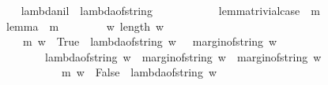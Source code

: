 \begin{isabellebody}
\ \ \isanewline
{}\isamarkupfalse%
\ lambda{\isacharunderscore}nil\ {\isacharcolon}\ {\isachardoublequoteopen}lambda{\isacharunderscore}of{\isacharunderscore}string\ {\isacharbrackleft}{\isacharbrackright}\ {\isacharequal}\ {}{\isachardoublequoteclose}\isanewline
%
\isadelimproof
\ \ %
\endisadelimproof
%
\isatagproof
{}\isamarkupfalse%
%
\endisatagproof
{\isafoldproof}%
%
\isadelimproof
\isanewline
%
\endisadelimproof
\ \ \ \ \isanewline
{}\isamarkupfalse%
\ lemma{\isacharunderscore}{}{\isacharunderscore}{}{}{\isacharunderscore}trivial{\isacharunderscore}case\ {\isacharcolon}\ {\isachardoublequoteopen}m\ {\isacharbrackleft}{\isacharbrackright}\ {\isacharequal}\ {\isacharparenleft}{}{\isacharcomma}{}{\isacharparenright}{\isachardoublequoteclose}\isanewline
%
\isadelimproof
%
\endisadelimproof
%
\isatagproof
{}\isamarkupfalse%
%
\endisatagproof
{\isafoldproof}%
%
\isadelimproof
\isanewline
%
\endisadelimproof
\ \ \isanewline
{}\isamarkupfalse%
\ lemma{\isacharunderscore}{}{\isacharunderscore}{}{}\ {\isacharcolon}\ {\isachardoublequoteopen}{\isacharparenleft}m\ {\isacharbrackleft}{\isacharbrackright}\ {\isacharequal}\ {\isacharparenleft}{}{\isacharcomma}{}{\isacharparenright}{\isacharparenright}\ {\isasymand}\ \isanewline
\ \ {\isacharparenleft}{\isasymforall}\ w{\isachardot}\ {\isacharparenleft}{\isacharparenleft}length\ w\ {\isachargreater}\ {}{\isacharparenright}\ {\isasymlongrightarrow}\ {\isacharparenleft}\ \isanewline
\ \ \ \ {\isacharparenleft}m\ {\isacharparenleft}w\ {\isacharat}\ {\isacharbrackleft}True{\isacharbrackright}{\isacharparenright}\ {\isacharequal}\ {\isacharparenleft}lambda{\isacharunderscore}of{\isacharunderscore}string\ w\ {\isacharplus}\ {}{\isacharcomma}\ margin{\isacharunderscore}of{\isacharunderscore}string\ w\ {\isacharplus}\ {}{\isacharparenright}{\isacharparenright}\ \isanewline
\ \ \ \ \ {\isasymand}\ \ \ {\isacharparenleft}{\isacharparenleft}lambda{\isacharunderscore}of{\isacharunderscore}string\ w\ {\isachargreater}\ margin{\isacharunderscore}of{\isacharunderscore}string\ w{\isacharparenright}\ {\isasymand}\ {\isacharparenleft}margin{\isacharunderscore}of{\isacharunderscore}string\ w\ {\isacharequal}\ {}{\isacharparenright}\isanewline
\ \ \ \ \ \ \ \ \ \ {\isasymlongrightarrow}\ {\isacharparenleft}m\ {\isacharparenleft}w\ {\isacharat}\ {\isacharbrackleft}False{\isacharbrackright}{\isacharparenright}\ {\isacharequal}\ {\isacharparenleft}lambda{\isacharunderscore}of{\isacharunderscore}string\ w\ {\isacharminus}\ {}{\isacharcomma}\ {}{\isacharparenright}{\isacharparenright}{\isacharparenright}\isanewline

\end{isabellebody}
